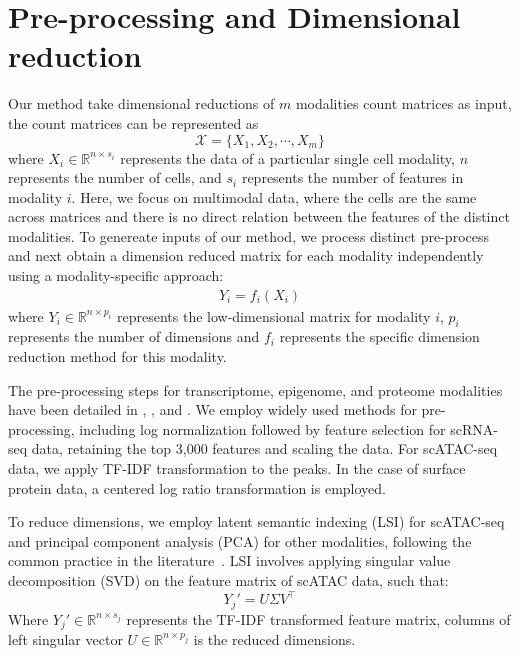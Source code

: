 \section{Pre-processing and Dimensional reduction}
\label{methods:integration:pre}
Our method take dimensional reductions of $m$ modalities count matrices as input, the count matrices can be represented as
\begin{equation}
    \mathcal{X}=\{X_1,X_2,\cdots,X_m\}
\end{equation}
where $X_{i} \in \mathbb{R}^{n\times s_{i}}$ represents the data of a particular single cell modality, $n$ represents the number of cells, and $s_{i}$ represents the number of features in modality $i$. Here, we focus on multimodal data, where the cells are the same across matrices and there is no direct relation between the features of the distinct modalities. To genereate inputs of our method, we process distinct pre-process and next obtain a dimension reduced matrix for each modality independently using a modality-specific approach:
\begin{align}
    Y_{i}=f_{i}(X_{i})
\end{align}
where $Y_{i} \in \mathbb{R}^{n\times p_{i}}$ represents the low-dimensional matrix for modality $i$, $p_{i}$ represents the number of dimensions and $f_{i}$ represents the specific dimension reduction method for this modality.

The pre-processing steps for transcriptome, epigenome, and proteome modalities have been detailed in , , and . We employ widely used methods for pre-processing, including log normalization followed by feature selection for scRNA-seq data, retaining the top 3,000 features and scaling the data. For scATAC-seq data, we apply TF-IDF transformation to the peaks. In the case of surface protein data, a centered log ratio transformation is employed.


To reduce dimensions, we employ latent semantic indexing (LSI) for scATAC-seq and principal component analysis (PCA) for other modalities, following the common practice in the literature~\cite{granja2021archr, signac, hao2021seurat4}. LSI involves applying singular value decomposition (SVD) on the feature matrix of scATAC data, such that:
\begin{equation}
    Y_{j}' = U\Sigma V^\top
\end{equation}
Where $Y_{j}'\in \mathbb{R}^{n\times s_{j}}$ represents the TF-IDF transformed feature matrix, columns of left singular vector $U\in \mathbb{R}^{n\times p_j}$ is the reduced dimensions.

